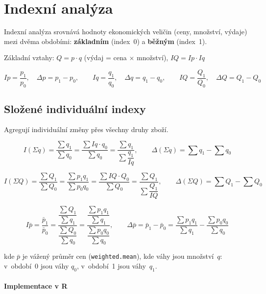 \documentclass[a4paper, 11pt]{article}
\begin{document}
\clearpage
\section{Indexní analýza}

Indexní analýza srovnává hodnoty ekonomických veličin (ceny, množství, výdaje)
mezi dvěma obdobími: \textbf{základním} (index~0) a \textbf{běžným} (index~1).

\medskip
\noindent Základní vztahy: $Q = p \cdot q$ (výdaj = cena $\times$ množství),
$IQ = Ip \cdot Iq$

\begin{equation*}
	Ip = \frac{p_1}{p_0}, \quad \Delta p = p_1 - p_0, \qquad
	Iq = \frac{q_1}{q_0}, \quad \Delta q = q_1 - q_0, \qquad
	IQ = \frac{Q_1}{Q_0}, \quad \Delta Q = Q_1 - Q_0
\end{equation*}

\subsection{Složené individuální indexy}

Agregují individuální změny přes všechny druhy zboží.

\begin{equation*}
	I(\Sigma q) = \frac{\sum q_1}{\sum q_0}
	= \frac{\sum Iq \cdot q_0}{\sum q_0}
	= \frac{\sum q_1}{\sum \dfrac{q_1}{Iq}},
	\qquad
	\Delta(\Sigma q) = \sum q_1 - \sum q_0
\end{equation*}

\begin{equation*}
	I(\Sigma Q) = \frac{\sum Q_1}{\sum Q_0}
	= \frac{\sum p_1 q_1}{\sum p_0 q_0}
	= \frac{\sum IQ \cdot Q_0}{\sum Q_0}
	= \frac{\sum Q_1}{\sum \dfrac{Q_1}{IQ}},
	\qquad
	\Delta(\Sigma Q) = \sum Q_1 - \sum Q_0
\end{equation*}

\begin{equation*}
	I\bar{p} = \frac{\bar{p}_1}{\bar{p}_0}
	= \frac{\dfrac{\sum Q_1}{\sum q_1}}{\dfrac{\sum Q_0}{\sum q_0}}
	= \frac{\dfrac{\sum p_1 q_1}{\sum q_1}}{\dfrac{\sum p_0 q_0}{\sum q_0}},
	\qquad
	\Delta\bar{p} = \bar{p}_1 - \bar{p}_0
	= \frac{\sum p_1 q_1}{\sum q_1} - \frac{\sum p_0 q_0}{\sum q_0}
\end{equation*}

kde $\bar{p}$ je vážený průměr cen (\texttt{weighted.mean}),
kde váhy jsou množství~$q$: v~období~0 jsou váhy $q_0$, v~období~1 jsou váhy~$q_1$.

\paragraph{Implementace v R}\mbox{}\par
\end{document}
